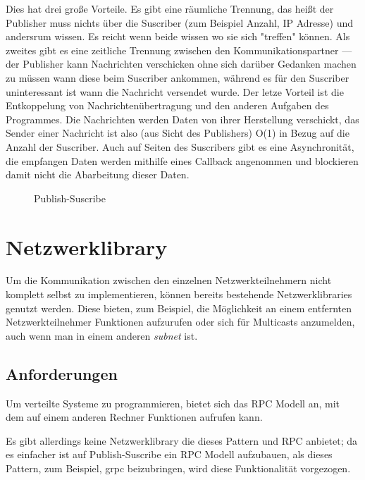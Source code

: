 Dies hat drei gro{\ss}e Vorteile. Es gibt eine r{\"{a}}umliche Trennung, das hei{\ss}t der Publisher muss
nichts {\"{u}}ber die Suscriber (zum Beispiel Anzahl, IP Adresse) und andersrum wissen. Es reicht
wenn beide wissen wo sie sich "treffen" k{\"{o}}nnen. Als zweites gibt es eine zeitliche Trennung zwischen
den Kommunikationspartner --- der Publisher kann Nachrichten verschicken ohne sich dar{\"{u}}ber Gedanken
machen zu m{\"{u}}ssen wann diese beim Suscriber ankommen, w{\"{a}}hrend es f{\"{u}}r den Suscriber
uninteressant ist wann die Nachricht versendet wurde. Der letze Vorteil ist die Entkoppelung von
Nachrichten{\"{u}}bertragung und den anderen Aufgaben des Programmes. Die Nachrichten werden Daten
von ihrer Herstellung verschickt, das Sender einer Nachricht ist also (aus Sicht des
Publishers) O(1) in Bezug auf die Anzahl der Suscriber. Auch auf Seiten des Suscribers gibt es eine
Asynchronit{\"{a}}t, die empfangen Daten werden mithilfe eines Callback angenommen und blockieren damit
nicht die Abarbeitung dieser Daten.

\begin{figure}
	\centering
	\caption{Publish-Suscribe}
	\label{fig:pubsub}
\end{figure}


\clearpage
\section{Netzwerklibrary}
Um die Kommunikation zwischen den einzelnen Netzwerkteilnehmern nicht komplett selbst zu implementieren, k{\"{o}}nnen bereits bestehende Netzwerklibraries genutzt werden.
Diese bieten, zum Beispiel, die M{\"{o}}glichkeit an einem entfernten Netzwerkteilnehmer Funktionen aufzurufen oder sich f{\"{u}}r Multicasts anzumelden, auch wenn man in einem anderen
\textit{subnet} ist.

\subsection{Anforderungen}
Um verteilte Systeme zu programmieren, bietet sich das RPC Modell an, mit dem auf einem anderen Rechner Funktionen aufrufen kann.

Es gibt allerdings keine Netzwerklibrary die dieses Pattern und RPC anbietet; da es einfacher ist auf Publish-Suscribe ein RPC Modell aufzubauen, als dieses Pattern, zum Beispiel, grpc beizubringen, wird
diese Funktionalit{\"{a}}t vorgezogen.

